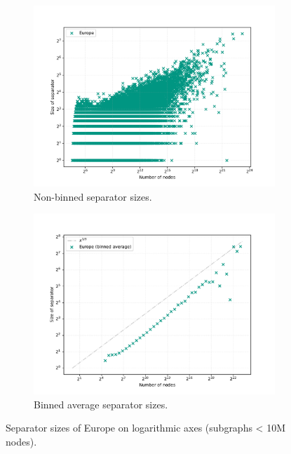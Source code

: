 \begin{figure}[tbhp]
    \begin{subfigure}{0.49\linewidth}
        \centering
        \includegraphics[width=\linewidth]{graphics/Europe_non_binned.png}
        \caption{Non-binned separator sizes.}
        \label{fig:separator_size_loglog_non_binned}
    \end{subfigure}
    \hfill
	\begin{subfigure}{0.49\linewidth}
		\centering
		\includegraphics[width=\linewidth]{graphics/Europe-binned.pdf}
		\caption{Binned average separator sizes.}
        \label{fig:separator_size_loglog_binned}
	\end{subfigure}
    \caption{Separator sizes of Europe on logarithmic axes (subgraphs < 10M nodes).}
    \label{fig:separator_size_loglog}
\end{figure}

